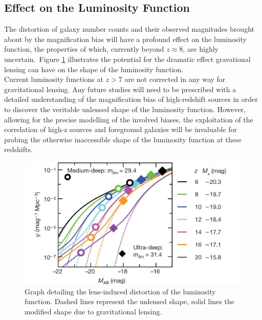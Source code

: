 \documentclass [a4paper, 12pt] {article}
\begin{document}
\subsection{Effect on the Luminosity Function}

The distortion of galaxy number counts and their observed magnitudes brought about by the magnification bias will have a profound effect on the luminosity function, the properties of which, currently beyond $z\approx8$, are highly uncertain.~Figure \ref{fig:gravlumfun} illustrates the potential for the dramatic effect gravational lensing can have on the shape of the luminosity function.
\\
\newline
Current luminosity functions at $z>7$ are not corrected in any way for gravitational lensing. Any future studies will need to be prescribed with a detailed understanding of the magnification bias of high-redshift sources in order to discover the veritable unlensed shape of the luminosity function. However, allowing for the precise modelling of the involved biases, the exploitation of the correlation of high-z sources and foreground galaxies will be invaluable for probing the otherwise inaccessible shape of the luminosity function at these redshifts.

\begin{figure}
\begin{center}
\includegraphics[scale=0.5]{gravlumfun.jpg}
\end{center}
\caption{Graph detailing the lens-induced distortion of the luminosity function. Dashed lines represent the unlensed shape, solid lines the modified shape due to gravitational lensing.}\label{fig:gravlumfun}
\end{figure}
\end{document}
